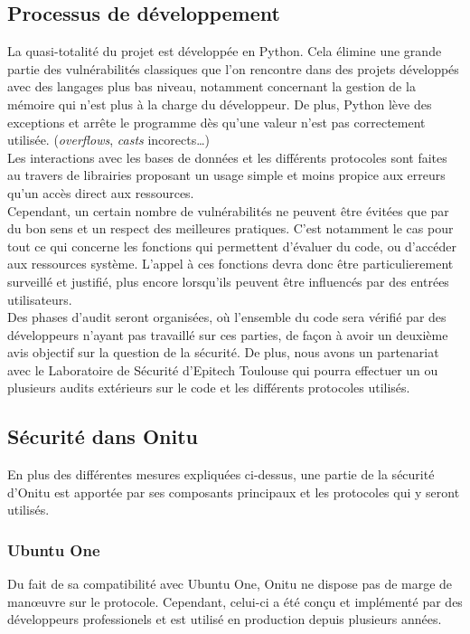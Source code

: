 \subsection{Processus de développement}

La quasi-totalité du projet est développée en Python. Cela élimine une grande partie des vulnérabilités classiques que l'on rencontre dans des projets développés avec des langages plus bas niveau, notamment concernant la gestion de la mémoire qui n'est plus à la charge du développeur. De plus, Python lève des exceptions et arrête le programme dès qu'une valeur n'est pas correctement utilisée. (\textit{overflows}, \textit{casts} incorects…)\\

Les interactions avec les bases de données et les différents protocoles sont faites au travers de librairies proposant un usage simple et moins propice aux erreurs qu'un accès direct aux ressources.\\

Cependant, un certain nombre de vulnérabilités ne peuvent être évitées que par du bon sens et un respect des meilleures pratiques. C'est notamment le cas pour tout ce qui concerne les fonctions qui permettent d'évaluer du code, ou d'accéder aux ressources système. L'appel à ces fonctions devra donc être particulierement surveillé et justifié, plus encore lorsqu'ils peuvent être influencés par des entrées utilisateurs.\\

Des phases d'audit seront organisées, où l'ensemble du code sera vérifié par des développeurs n'ayant pas travaillé sur ces parties, de façon à avoir un deuxième avis objectif sur la question de la sécurité. De plus, nous avons un partenariat avec le Laboratoire de Sécurité d'Epitech Toulouse qui pourra effectuer un ou plusieurs audits extérieurs sur le code et les différents protocoles utilisés.

\subsection{Sécurité dans Onitu}

En plus des différentes mesures expliquées ci-dessus, une partie de la sécurité d'Onitu est apportée par ses composants principaux et les protocoles qui y seront utilisés.

\subsubsection{Ubuntu One}
Du fait de sa compatibilité avec Ubuntu One, Onitu ne dispose pas de marge de manœuvre sur le protocole. Cependant, celui-ci a été conçu et implémenté par des développeurs professionels et est utilisé en production depuis plusieurs années.\\

